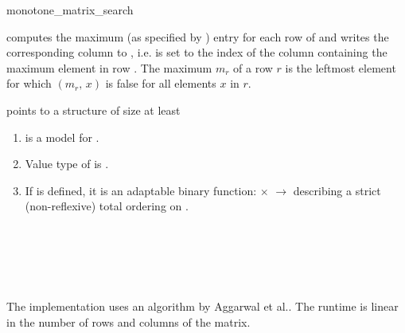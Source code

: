 \begin{ccRefFunction}{monotone_matrix_search}
\begin{ccAdvanced}
    \def\ccLongParamLayout{\ccTrue} 
    
    
    computes the maximum (as specified by )
    entry for each row of  and writes the corresponding column
    to , i.e.  is set to the index of the column
    containing the maximum element in row . The maximum $m_r$
    of a row $r$ is the leftmost element for which
    $(m_r,\,x)$ is false for all elements $x$ in
    $r$.
    
    \cgalColumnLayout
    \ccPrecond {} points to a structure of size at least

    \ccRequire
    \begin{enumerate}
    \item {} is a model for
      .
    \item Value type of  is .
    \item If  is defined, it is an adaptable
      binary function:  $\times$
       $\rightarrow$  describing a strict
      (non-reflexive) total ordering on .
    \end{enumerate}
    
    \ccSeeAlso
    \\
    \\
    \\
    \\

    \ccImplementation The implementation uses an algorithm by Aggarwal
    et al.\cite{akmsw-gamsa-87}. The runtime is linear in the number
    of rows and columns of the matrix.

  \end{ccAdvanced}  
\end{ccRefFunction}

